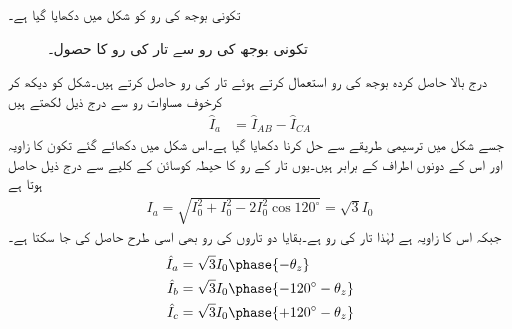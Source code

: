 تکونی بوجھ کی رو کو شکل  میں دکھایا گیا ہے۔
\begin{figure}
\centering
{}
\caption{تکونی بوجھ کی رو سے تار کی رو کا حصول۔}
\label{شکل_تین_تکونی_بوجھ_تار_رو}
\end{figure}

درج بالا حاصل کردہ بوجھ کی رو استعمال کرتے ہوئے تار کی رو حاصل کرتے ہیں۔شکل  کو دیکھ کر کرخوف مساوات رو سے درج ذیل لکھتے ہیں
\begin{align*}
\hat{I}_a&=\hat{I}_{AB}-\hat{I}_{CA}
\end{align*}
جسے شکل  میں ترسیمی طریقے سے حل کرنا دکھایا گیا ہے۔اس شکل میں دکھائے گئے تکون کا زاویہ  اور اس کے دونوں  اطراف  کے برابر ہیں۔یوں تار کے رو کا حیطہ کوسائن کے کلیے سے درج ذیل حاصل ہوتا ہے
\begin{align*}
I_a=\sqrt{I_0^2+I_0^2-2I_0^2\cos 120^{\circ}}=\sqrt{3}I_0
\end{align*}
جبکہ اس کا زاویہ  ہے لہٰذا تار کی رو   ہے۔بقایا دو تاروں کی رو بھی اسی طرح حاصل کی جا سکتا ہے۔
\begin{gather}
\begin{aligned}
\hat{I}_a&=\sqrt{3}I_0 \phase{-\theta_z}\\
\hat{I}_b&=\sqrt{3}I_0 \phase{-120^{\circ}-\theta_z}\\
\hat{I}_c&=\sqrt{3}I_0 \phase{+120^{\circ}-\theta_z}
\end{aligned}
\end{gather}

